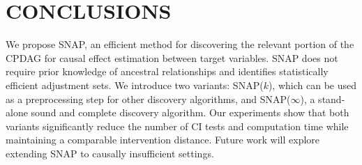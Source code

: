 \section{CONCLUSIONS}
\label{sec:conclusion}

We propose SNAP, an efficient method for discovering the relevant portion of the CPDAG for causal effect estimation between target variables.
SNAP does not require prior knowledge of ancestral relationships and identifies statistically efficient adjustment sets.
We introduce two variants: SNAP($k$), which can be used as a preprocessing step for other discovery algorithms, and SNAP($\infty$), a stand-alone sound and complete discovery algorithm.
Our experiments show that both variants significantly reduce the number of CI tests and computation time while maintaining a comparable intervention distance. 
Future work will explore extending SNAP to causally insufficient settings.